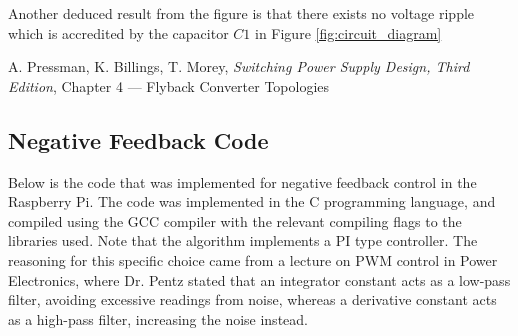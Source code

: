 \documentclass[a4paper, 12pt]{article}
\begin{document}
Another deduced result from the figure is that there exists no voltage ripple which is accredited by the capacitor $C1$ in Figure \ref{fig:circuit_diagram}  








\begin{thebibliography}{0}
	 A. Pressman, K. Billings, T. Morey, \textit{Switching Power Supply Design, Third Edition}, Chapter 4 --- Flyback Converter Topologies
\end{thebibliography}

\newpage
\begin{appendices}
	\section{Negative Feedback Code}
	\label{sec:feedback_code}
	Below is the code that was implemented for negative feedback control in
	the Raspberry Pi. The code was implemented in the C programming
	language, and compiled using the GCC compiler with the relevant
	compiling flags to the libraries used. Note that the algorithm
	implements a PI type controller. The reasoning for this specific choice
	came from a lecture on PWM control in Power Electronics, where Dr.
	Pentz stated that an integrator constant acts as a low-pass filter,
	avoiding excessive readings from noise, whereas a derivative constant
	acts as a high-pass filter, increasing the noise instead.
	

\end{appendices}
\end{document}
